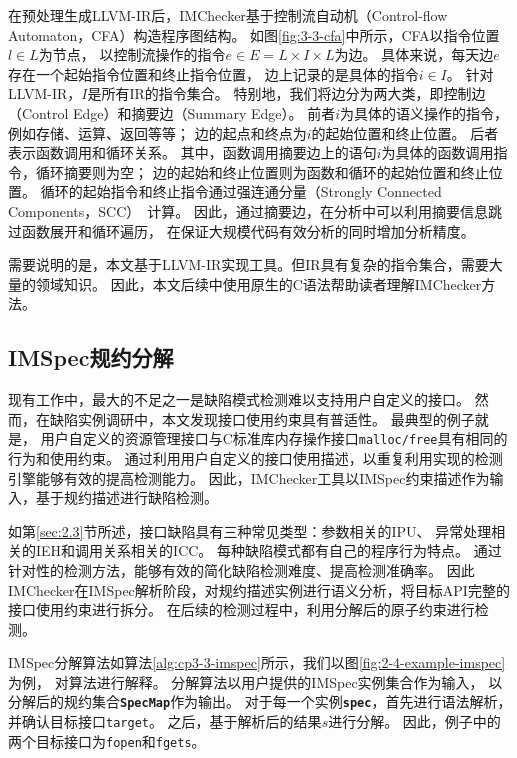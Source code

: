 在预处理生成LLVM-IR后，IMChecker基于控制流自动机（Control-flow Automaton，CFA）构造程序图结构。
如图\ref{fig:3-3-cfa}中所示，CFA以指令位置$l \in L$为节点，
以控制流操作的指令$e \in E = L \times I \times L$为边。
具体来说，每天边$e$存在一个起始指令位置和终止指令位置，
边上记录的是具体的指令$i \in I$。
针对LLVM-IR，$I$是所有IR的指令集合。
特别地，我们将边分为两大类，即控制边（Control Edge）和摘要边（Summary Edge）。
前者$i$为具体的语义操作的指令，例如存储、运算、返回等等；
边的起点和终点为$i$的起始位置和终止位置。
后者表示函数调用和循环关系。
其中，函数调用摘要边上的语句$i$为具体的函数调用指令，循环摘要则为空；
边的起始和终止位置则为函数和循环的起始位置和终止位置。
循环的起始指令和终止指令通过强连通分量（Strongly Connected Components，SCC）~\cite{12-ele-scc}计算。
因此，通过摘要边，在分析中可以利用摘要信息跳过函数展开和循环遍历，
在保证大规模代码有效分析的同时增加分析精度。


需要说明的是，本文基于LLVM-IR实现工具。但IR具有复杂的指令集合，需要大量的领域知识。
因此，本文后续中使用原生的C语法帮助读者理解IMChecker方法。

\subsection{IMSpec规约分解}
现有工作中，最大的不足之一是缺陷模式检测难以支持用户自定义的接口。
然而，在缺陷实例调研中，本文发现接口使用约束具有普适性。
最典型的例子就是，
用户自定义的资源管理接口与C标准库内存操作接口\texttt{malloc/free}具有相同的行为和使用约束。
通过利用用户自定义的接口使用描述，以重复利用实现的检测引擎能够有效的提高检测能力。
因此，IMChecker工具以IMSpec约束描述作为输入，基于规约描述进行缺陷检测。

如第\ref{sec:2.3}节所述，接口缺陷具有三种常见类型：参数相关的IPU、
异常处理相关的IEH和调用关系相关的ICC。
每种缺陷模式都有自己的程序行为特点。
通过针对性的检测方法，能够有效的简化缺陷检测难度、提高检测准确率。
因此IMChecker在IMSpec解析阶段，对规约描述实例进行语义分析，将目标API完整的接口使用约束进行拆分。
在后续的检测过程中，利用分解后的原子约束进行检测。



IMSpec分解算法如算法\ref{alg:cp3-3-imspec}所示，我们以图\ref{fig:2-4-example-imspec}为例，
对算法进行解释。
分解算法以用户提供的IMSpec实例集合作为输入，
以分解后的规约集合\textbf{\texttt{SpecMap}}作为输出。
对于每一个实例\textbf{\texttt{spec}}，首先进行语法解析，并确认目标接口\texttt{target}。
之后，基于解析后的结果$s$进行分解。
因此，例子中的两个目标接口为\texttt{fopen}和\texttt{fgets}。

